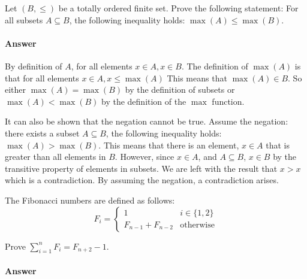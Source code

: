 \documentclass{article}
\begin{document}
 

Let $(B,\leq)$ be a totally ordered finite set. Prove the following
statement: For all subsets $A \subseteq B$, the following inequality
holds: $\max(A) \leq \max(B)$.

\paragraph{Answer}

By definition of $A$, for all elements $x \in A, x\in B$. The definition of $\max(A)$ is that for all elements $x \in A, x \leq \max(A)$
This means that $\max(A) \in B$. So either $\max(A) = \max(B)$ by the definition of subsets or $ \max(A) < \max(B)$ by the definition of the $\max$ function.

It can also be shown that the negation cannot be true. Assume the negation: there exists a subset  $A \subseteq B$, the following inequality
holds: $\max(A) > \max(B)$. This means that there is an element, $x \in A$ that is greater than all elements in $B$. However, since $x \in A$,
 and $A \subseteq B$, $x \in B$ by the transitive property of elements in subsets. We are left with the result that $x>x$ which is a contradiction. 
 By assuming the negation, a contradiction arises.

 

The Fibonacci numbers are defined as follows:
$$
    F_i = \begin{cases}
            1 & i \in \{1,2\} \\
            F_{n-1}+F_{n-2} & \text{otherwise}
          \end{cases}
$$

Prove $\sum_{i=1}^n F_i = F_{n+2}-1$.

\paragraph{Answer}


 
\end{document}
